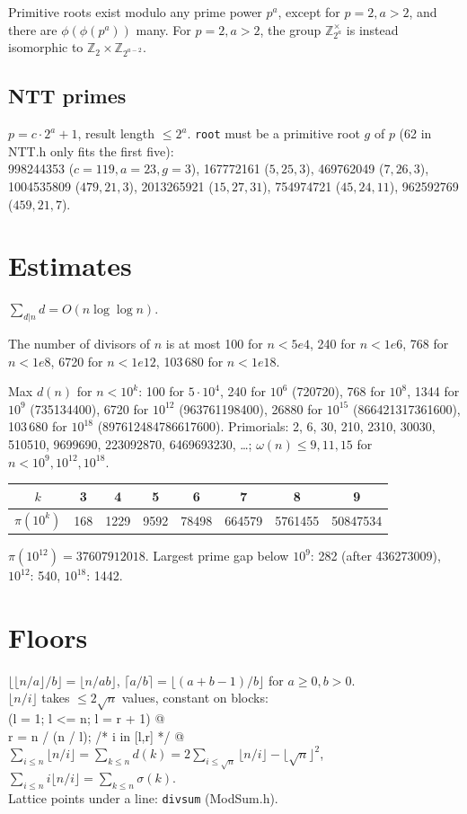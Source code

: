 	Primitive roots exist modulo any prime power $p^a$, except for $p = 2, a > 2$, and there are $\phi(\phi(p^a))$ many.
	For $p = 2, a > 2$, the group $\mathbb Z_{2^a}^\times$ is instead isomorphic to $\mathbb Z_2 \times \mathbb Z_{2^{a-2}}$.

	\subsection{NTT primes}
	$p=c\cdot2^a+1$, result length $\le2^a$. \texttt{root} must be a primitive root $g$ of $p$ (62 in NTT.h only fits the first five):\\
	998244353 ($c{=}119,a{=}23,g{=}3$), 167772161 ($5,25,3$), 469762049 ($7,26,3$), 1004535809 ($479,21,3$), 2013265921 ($15,27,31$), 754974721 ($45,24,11$), 962592769 ($459,21,7$).

\section{Estimates}
	$\sum_{d|n} d = O(n \log \log n)$.

	The number of divisors of $n$ is at most 100 for $n < 5e4$, 240 for $n < 1e6$, 768 for $n < 1e8$, 6720 for $n < 1e12$, 103\,680 for $n < 1e18$.

	Max $d(n)$ for $n<10^k$: 100 for $5\cdot10^4$, 240 for $10^6$ (720720), 768 for $10^8$, 1344 for $10^9$ (735134400), 6720 for $10^{12}$ (963761198400), 26880 for $10^{15}$ (866421317361600), 103\,680 for $10^{18}$ (897612484786617600).
	Primorials: 2, 6, 30, 210, 2310, 30030, 510510, 9699690, 223092870, 6469693230, \dots; $\omega(n)\le9,11,15$ for $n<10^9,10^{12},10^{18}$.

	\begin{center}
	\begin{tabular}{c|c@{\ }c@{\ }c@{\ }c@{\ }c@{\ }c@{\ }c}
	$k$ & 3 & 4 & 5 & 6 & 7 & 8 & 9\\ \hline
	$\pi(10^k)$ & 168 & 1229 & 9592 & 78498 & 664579 & 5761455 & 50847534
	\end{tabular}
	\end{center}
	$\pi(10^{12})=37607912018$. Largest prime gap below $10^9$: 282 (after 436273009), $10^{12}$: 540, $10^{18}$: 1442.

\section{Floors}
$\lfloor\lfloor n/a\rfloor/b\rfloor=\lfloor n/ab\rfloor$, $\lceil a/b\rceil=\lfloor(a+b-1)/b\rfloor$ for $a\ge0,b>0$.\\
$\lfloor n/i\rfloor$ takes $\le2\sqrt n$ values, constant on blocks:\\
\verb@for (l = 1; l <= n; l = r + 1) {@\\
\verb@  r = n / (n / l); /* i in [l,r] */ }@\\
$\sum_{i\le n}\lfloor n/i\rfloor=\sum_{k\le n}d(k)=2\sum_{i\le\sqrt n}\lfloor n/i\rfloor-\lfloor\sqrt n\rfloor^2$,\\
$\sum_{i\le n}i\lfloor n/i\rfloor=\sum_{k\le n}\sigma(k)$.\\
Lattice points under a line: \texttt{divsum} (ModSum.h).

